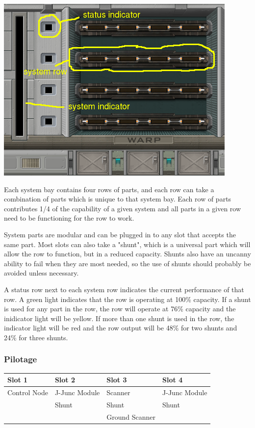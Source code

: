 \includegraphics[scale=0.70]{images/interior-warp.png}

Each system bay contains four rows of parts, and each row can take a
combination of parts which is unique to that system bay.  Each row of
parts contributes 1/4 of the capability of a given system and all parts
in a given row need to be functioning for the row to work.

System parts are modular and can be plugged in to any slot that accepts the
same part.  Most slots can also take a "shunt", which is a universal part
which will allow the row to function, but in a reduced capacity.  Shunts
also have an uncanny ability to fail when they are most needed, so the use
of shunts should probably be avoided unless necessary.

A status row next to each system row indicates the current performance
of that row.  A green light indicates that the row is operating at
100\% capacity.  If a shunt is used for any part in the row, the row will
operate at 76\% capacity and the inidicator light will be yellow.  If
more than one shunt is used in the row, the indicator light will be red
and the row output will be 48\% for two shunts and 24\% for three shunts.

\subsubsection{Pilotage}

\begin{tabular}{ | p{2.5cm} | p{2.5cm} | p{2.5cm} | p{2.5cm} | }
\hline
Slot 1 & Slot 2 & Slot 3 & Slot 4 \\ \hline
Control Node & J-Junc Module & Scanner & J-Junc Module \\
& Shunt & Shunt & Shunt \\
& & Ground Scanner & \\
\hline
\end{tabular}

